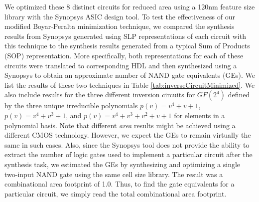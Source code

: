 We optimized these $8$ distinct circuits for reduced area using a 120nm feature size library with the Synopsys ASIC design tool. To test the effectiveness of our modified Boyar-Peralta minimization technique, we compared the synthesis results from Synopsys generated using SLP representations of each circuit with this technique to the synthesis results generated from a typical Sum of Products (SOP) representation. More specifically, both representations for each of these circuits were translated to corresponding HDL and then synthesized using a Synopsys to obtain an approximate number of NAND gate equivalents (GEs). We list the results of these two techniques in Table \ref{tab:inverseCircuitMinimized}. We also include results for the three different inversion circuits for $GF(2^4)$ defined by the three unique irreducible polynomials $p(v) = v^4 + v + 1$, $p(v) = v^4 + v^3 + 1$, and $p(v) = v^4 + v^3 + v^2 + v + 1$ for elements in a polynomial basis. Note that different \emph{area} results might be achieved using a different CMOS technology. However, we expect the GEs to remain virtually the same in such cases. Also, since the Synopsys tool does not provide the ability to extract the number of logic gates used to implement a particular circuit after the synthesis task, we estimated the GEs by synthesizing and optimizing a single two-input NAND gate using the same cell size library. The result was a combinational area footprint of 1.0. Thus, to find the gate equivalents for a particular circuit, we simply read the total combinational area footprint. 

